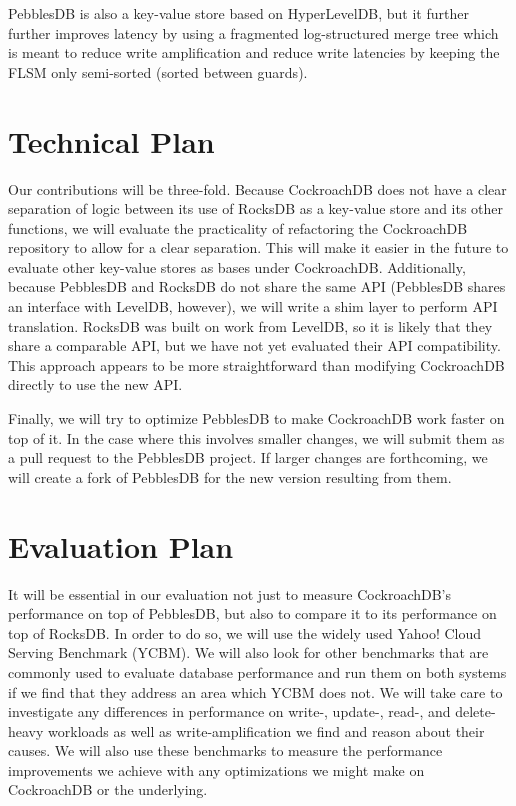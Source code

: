 \documentclass[10pt,twocolumn,letterpaper]{article}
\begin{document}
PebblesDB is also a key-value store based on HyperLevelDB, but it further
further improves latency by using a fragmented log-structured merge tree which
is meant to reduce write amplification and reduce write latencies by keeping
the FLSM only semi-sorted (sorted between guards).


\section{Technical Plan}
Our contributions will be three-fold. Because CockroachDB does not have a clear
separation of logic between its use of RocksDB as a key-value store and its
other functions, we will evaluate the practicality of refactoring the
CockroachDB repository to allow for a clear separation. This will make it
easier in the future to evaluate other key-value stores as bases under
CockroachDB. Additionally, because PebblesDB and RocksDB do not share the same
API (PebblesDB shares an interface with LevelDB, however), we will write a shim
layer to perform API translation. RocksDB was built on work from LevelDB, so it
is likely that they share a comparable API, but we have not yet evaluated their
API compatibility. This approach appears to be more straightforward than
modifying CockroachDB directly to use the new API.

Finally, we will try to optimize PebblesDB to make CockroachDB work faster on
top of it. In the case where this involves smaller changes, we will submit them
as a pull request to the PebblesDB project. If larger changes are forthcoming,
we will create a fork of PebblesDB for the new version resulting from them.


\section{Evaluation Plan}
It will be essential in our evaluation not just to measure CockroachDB's
performance on top of PebblesDB, but also to compare it to its performance on
top of RocksDB. In order to do so, we will use the widely used Yahoo! Cloud
Serving Benchmark (YCBM). We will also look for other benchmarks that are
commonly used to evaluate database performance and run them on both systems if
we find that they address an area which YCBM does not. We will take care to
investigate any differences in performance on write-, update-, read-, and
delete-heavy workloads as well as write-amplification we find and reason about
their causes. We will also use these benchmarks to measure the performance
improvements we achieve with any optimizations we might make on CockroachDB or
the underlying.
\end{document}

